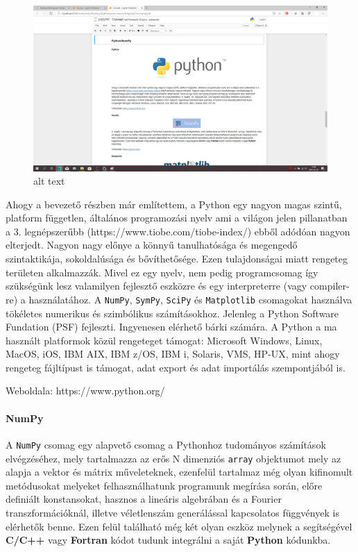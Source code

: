\begin{figure}
\centering
\includegraphics{img/Jupyter_screenshot.png}
\caption{alt text}
\end{figure}

Ahogy a bevezető részben már említettem, a Python egy nagyon magas
szintű, platform független, általános programozási nyelv ami a világon
jelen pillanatban a 3. legnépszerűbb
(https://www.tiobe.com/tiobe-index/) ebből adódóan nagyon elterjedt.
Nagyon nagy előnye a könnyű tanulhatósága és megengedő szintaktikája,
sokoldalúsága és bővíthetősége. Ezen tulajdonságai miatt rengeteg
területen alkalmazzák. Mivel ez egy nyelv, nem pedig programcsomag így
szükségünk lesz valamilyen fejlesztő eszközre és egy interpreterre (vagy
compiler-re) a használatához. A \texttt{NumPy}, \texttt{SymPy},
\texttt{SciPy} és \texttt{Matplotlib} csomagokat használva tökéletes
numerikus és szimbólikus számításokhoz. Jelenleg a Python Software
Fundation (PSF) fejleszti. Ingyenesen elérhető bárki számára. A Python a
ma használt platformok közül rengeteget támogat: Microsoft Windows,
Linux, MacOS, iOS, IBM AIX, IBM z/OS, IBM i, Solaris, VMS, HP-UX, mint
ahogy rengeteg fájltípust is támogat, adat export és adat importálás
szempontjából is.

Weboldala: https://www.python.org/

\paragraph{NumPy}\label{numpy}

A \texttt{NumPy} csomag egy alapvető csomag a Pythonhoz tudományos
számítások elvégzéséhez, mely tartalmazza az erős N dimenziós
\texttt{array} objektumot mely az alapja a vektor és mátrix
műveleteknek, ezenfelül tartalmaz még olyan kifinomult metódusokat
melyeket felhasználhatunk programunk megírása során, előre definiált
konstansokat, hasznos a lineáris algebrában és a Fourier
transzformációknál, illetve véletlenszám generálással kapcsolatos
függvények is elérhetők benne. Ezen felül található még két olyan eszköz
melynek a segítségével \textbf{C/C++} vagy \textbf{Fortran} kódot tudunk
integrálni a saját \textbf{Python} kódunkba.

